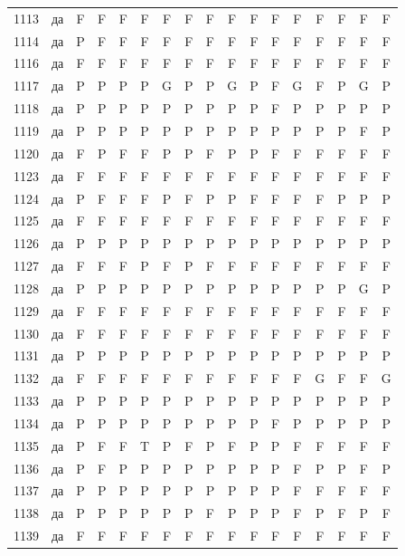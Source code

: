 \begin{table}[p]
\begin{tabular*}{\textwidth}{@{\extracolsep{\fill}}rcccccccccccccccc}
1113 & да & F & F & F & F & F & F & F & F & F & F & F & F & F & F & F\\
1114 & да & P & F & F & F & F & F & F & F & F & F & F & F & F & F & F\\
1116 & да & F & F & F & F & F & F & F & F & F & F & F & F & F & F & F\\
1117 & да & P & P & P & P & G & P & P & G & P & F & G & F & P & G & P\\
1118 & да & P & P & P & P & P & P & P & P & P & F & P & P & P & P & P\\
1119 & да & P & P & P & P & P & P & P & P & P & P & P & P & P & F & P\\
1120 & да & F & P & F & F & P & P & F & P & P & F & F & F & F & F & F\\
1123 & да & F & F & F & F & F & F & F & F & F & F & F & F & F & F & F\\
1124 & да & P & F & F & F & P & F & P & P & F & F & F & F & P & P & P\\
1125 & да & F & F & F & F & F & F & F & F & F & F & F & F & F & F & F\\
1126 & да & P & P & P & P & P & P & P & P & P & P & P & P & P & P & P\\
1127 & да & F & F & F & P & F & P & F & F & F & F & F & F & F & F & F\\
1128 & да & P & P & P & P & P & P & P & P & P & P & P & P & P & G & P\\
1129 & да & F & F & F & F & F & F & F & F & F & F & F & F & F & F & F\\
1130 & да & F & F & F & F & F & F & F & F & F & F & F & F & F & F & F\\
1131 & да & P & P & P & P & P & P & P & P & P & P & P & P & P & P & P\\
1132 & да & F & F & F & F & F & F & F & F & F & F & F & G & F & F & G\\
1133 & да & P & P & P & P & P & P & P & P & P & P & P & P & P & P & P\\
1134 & да & P & P & P & P & P & P & P & P & P & F & P & P & P & P & P\\
1135 & да & P & F & F & T & P & F & P & F & P & P & F & F & F & F & F\\
1136 & да & P & F & P & P & P & P & P & P & P & P & F & P & P & F & P\\
1137 & да & P & P & P & P & P & P & P & P & P & P & F & F & F & F & F\\
1138 & да & P & P & P & P & P & P & F & P & P & P & F & P & F & P & F\\
1139 & да & F & F & F & F & F & F & F & F & F & F & F & F & F & F & F\\
\bottomrule\end{tabular*}\end{table}
\clearpage
